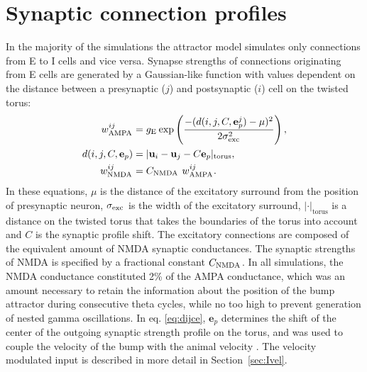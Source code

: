 \documentclass[a4paper,12pt]{article}
\newcommand{\ssc}[3]{\ensuremath{#1_{\text{#2}_{\text{#3}}}}}
\newcommand{\wAMPA   }{\ssc{w}      {\scriptsize{AMPA}}{}}
\newcommand{\wNMDA   }{\ssc{w}      {\scriptsize{NMDA}}{}}
\newcommand{\cNMDA   }{\ssc{C}      {\scriptsize{NMDA}}{}}
\newcommand{\sigmasub}[1]{\ssc{\sigma}{\scriptsize{#1}}{}}
\newcommand{\gE      }{\ssc{g}      {\scriptsize{E}}{}}
\newcommand{\dijce}{\ensuremath{d(i, j, C, \mathbf{e}_p^j)}}
\begin{document}


\section{Synaptic connection profiles} \label{conn_profiles}

In the majority of the simulations the attractor model 
simulates only connections from E to I cells and vice versa.
Synapse strengths of connections originating from E cells are generated by
a Gaussian-like function with values dependent on the distance between a
presynaptic ($j$) and postsynaptic ($i$) cell on the twisted torus:
\begin{align}
    \wAMPA^{ij} &= \gE \exp\left(
                   \frac{-(\dijce - \mu)^2}{2 \sigmasub{exc}^2}
                   \right), \label{eq:wAMPA} \\
    d(i, j, C, \mathbf{e}_p)  &= | \mathbf{u}_i - \mathbf{u}_j -
            C  \mathbf{e}_p |_{\mathrm{torus}}, \label{eq:dijce} \\
    \wNMDA^{ij} &= \cNMDA\ \wAMPA^{ij}. \label{eq:wNMDA}
\end{align}
In these equations, $\mu$ is the distance of the excitatory surround from the
position of presynaptic neuron, $\sigmasub{exc}$ is the width of the excitatory
surround, $|\cdot|_{\mathrm{torus}}$ is a distance on the twisted torus that
takes the boundaries of the torus into account and $C$ is the
synaptic profile shift. The excitatory connections are
composed of the equivalent amount of NMDA synaptic conductances. The synaptic
strengths of NMDA is specified by a fractional constant $\cNMDA$. In all
simulations, the NMDA conductance constituted 2\% of the AMPA conductance,
which was an amount necessary to retain the information about the position of
the bump attractor during consecutive theta cycles, while no too high to
prevent generation of nested gamma oscillations.
In eq. \eqref{eq:dijce}, $\mathbf{e}_p$ determines the shift of the center of
the outgoing synaptic strength profile on the torus, and was used to couple the
velocity of the bump with the animal velocity
\citep{Burak:2009fx,Pastoll:2013ff}. The velocity modulated input is described
in more detail in Section~\ref{sec:Ivel}.
\end{document}
